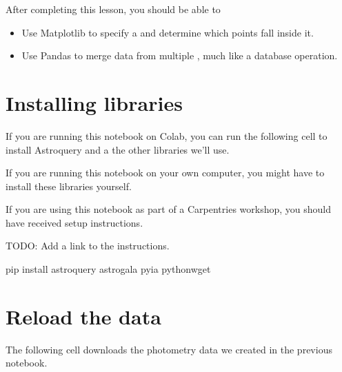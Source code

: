 \documentclass[letterpaper,10pt,english]{sphinxmanual}
\begin{document}
After completing this lesson, you should be able to
\begin{itemize}
\item {} 
Use Matplotlib to specify a  and determine which points fall inside it.

\item {} 
Use Pandas to merge data from multiple , much like a database  operation.

\end{itemize}


\section{Installing libraries}
\label{\detokenize{06_photo:installing-libraries}}
If you are running this notebook on Colab, you can run the following cell to install Astroquery and a the other libraries we’ll use.

If you are running this notebook on your own computer, you might have to install these libraries yourself.

If you are using this notebook as part of a Carpentries workshop, you should have received setup instructions.

TODO: Add a link to the instructions.

\begin{sphinxVerbatim}[commandchars=\\\{\}]

 
    

 
    pip install astroquery astro\PYGZhy{}gala pyia python\PYGZhy{}wget
\end{sphinxVerbatim}


\section{Reload the data}
\label{\detokenize{06_photo:reload-the-data}}
The following cell downloads the photometry data we created in the previous notebook.
\end{document}
